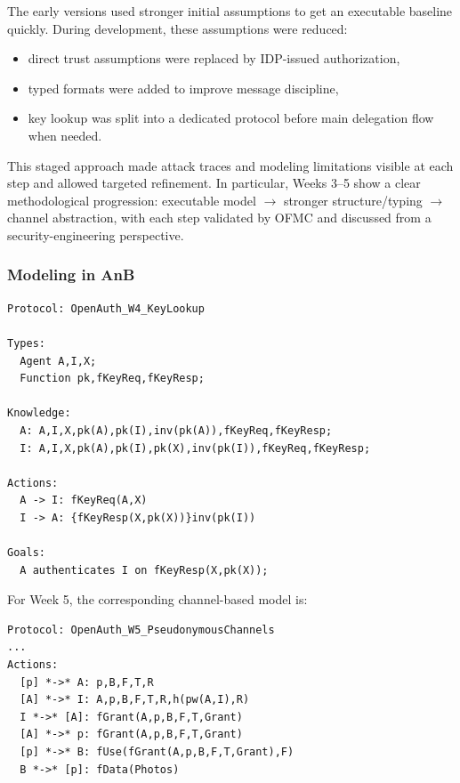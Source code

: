 The early versions used stronger initial assumptions to get an executable baseline quickly.
During development, these assumptions were reduced:
\begin{itemize}
  \item direct trust assumptions were replaced by IDP-issued authorization,
  \item typed formats were added to improve message discipline,
  \item key lookup was split into a dedicated protocol before main delegation flow when needed.
\end{itemize}

This staged approach made attack traces and modeling limitations visible at each step and allowed targeted refinement.
In particular, Weeks 3--5 show a clear methodological progression: executable model $\rightarrow$ stronger structure/typing $\rightarrow$ channel abstraction, with each step validated by OFMC and discussed from a security-engineering perspective.

\subsubsection{Modeling in AnB}

\begin{lstlisting}
Protocol: OpenAuth_W4_KeyLookup

Types:
  Agent A,I,X;
  Function pk,fKeyReq,fKeyResp;

Knowledge:
  A: A,I,X,pk(A),pk(I),inv(pk(A)),fKeyReq,fKeyResp;
  I: A,I,X,pk(A),pk(I),pk(X),inv(pk(I)),fKeyReq,fKeyResp;

Actions:
  A -> I: fKeyReq(A,X)
  I -> A: {fKeyResp(X,pk(X))}inv(pk(I))

Goals:
  A authenticates I on fKeyResp(X,pk(X));
\end{lstlisting}

For Week 5, the corresponding channel-based model is:
\begin{lstlisting}
Protocol: OpenAuth_W5_PseudonymousChannels
...
Actions:
  [p] *->* A: p,B,F,T,R
  [A] *->* I: A,p,B,F,T,R,h(pw(A,I),R)
  I *->* [A]: fGrant(A,p,B,F,T,Grant)
  [A] *->* p: fGrant(A,p,B,F,T,Grant)
  [p] *->* B: fUse(fGrant(A,p,B,F,T,Grant),F)
  B *->* [p]: fData(Photos)
\end{lstlisting}

